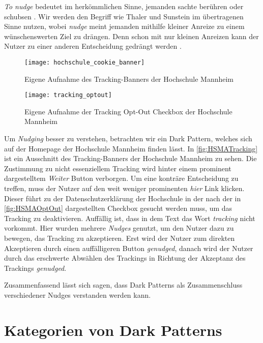 \documentclass[conference,compsoc,final,a4paper]{IEEEtran}
\begin{document}
\textit{To nudge} bedeutet im herkömmlichen Sinne, jemanden sachte berühren oder schubsen \autocite{MerriamWebsterNudge}. Wir werden den Begriff wie Thaler und Sunstein im übertragenen Sinne nutzen, wobei \textit{nudge} meint jemanden mithilfe kleiner Anreize zu einem wünschenswerten Ziel zu drängen. Denn schon mit nur kleinen Anreizen kann der Nutzer zu einer anderen Entscheidung gedrängt werden \autocite{Narayanan2020}.

\begin{figure}[!ht]
  \centering
  \texttt{[image: hochschule\_cookie\_banner]}
  \caption{Eigene Aufnahme des Tracking-Banners der Hochschule Mannheim~\autocite{HSMAWebsite2021}}
  \label{fig:HSMATracking}
\end{figure}

\begin{figure}[!ht]
  \centering
  \texttt{[image: tracking\_optout]}
  \caption{Eigene Aufnahme der Tracking Opt-Out Checkbox der Hochschule Mannheim~\autocite{HSMAWebsite2021}}
  \label{fig:HSMAOptOut}
\end{figure}

Um \textit{Nudging} besser zu verstehen, betrachten wir ein Dark Pattern, welches sich auf der Homepage der Hochschule Mannheim finden lässt. In \autoref{fig:HSMATracking} ist ein Ausschnitt des Tracking-Banners der Hochschule Mannheim zu sehen. Die Zustimmung zu nicht essenziellem Tracking wird hinter einem prominent dargestelltem \textit{Weiter} Button verborgen. Um eine konträre Entscheidung zu treffen, muss der Nutzer auf den weit weniger prominenten \textit{hier} Link klicken. Dieser führt zu der Datenschutzerklärung der Hochschule in der nach der in \autoref{fig:HSMAOptOut} dargestellten Checkbox gesucht werden muss, um das Tracking zu deaktivieren. Auffällig ist, dass in dem Text das Wort \textit{tracking} nicht vorkommt. Hier wurden mehrere \textit{Nudges} genutzt, um den Nutzer dazu zu bewegen, das Tracking zu akzeptieren. Erst wird der Nutzer zum direkten Akzeptieren durch einen auffälligeren Button \textit{genudged}, danach wird der Nutzer durch das erschwerte Abwählen des Trackings in Richtung der Akzeptanz des Trackings \textit{genudged}.

Zusammenfassend lässt sich sagen, dass Dark Patterns als Zusammenschluss verschiedener Nudges verstanden werden kann.

\section{Kategorien von Dark Patterns}
\end{document}
